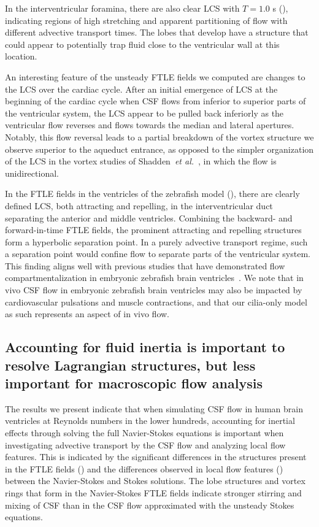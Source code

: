 \documentclass{template}
\begin{document}
In the interventricular foramina, there are also
clear LCS with $T=1.0$ s (),
indicating regions of high stretching and apparent partitioning of flow
with different advective transport times. The lobes that develop
have a structure that could appear to potentially trap fluid
close to the ventricular wall at this location.

An interesting feature of the unsteady FTLE fields we computed
are changes to the LCS over the cardiac cycle. After an initial emergence of LCS
at the beginning of the cardiac cycle when CSF flows from inferior to superior
parts of the ventricular system, the LCS appear to be pulled back inferiorly as the ventricular flow
reverses and flows towards the median and lateral apertures. Notably, this flow reversal
leads to a partial breakdown of the vortex structure we observe superior to the aqueduct entrance,
as opposed to the simpler organization of the LCS in the vortex studies of
Shadden~\emph{et al.}~\citep{shadden2006lagrangian,shadden2007transport},
in which the flow is unidirectional.

In the FTLE fields in the ventricles of the zebrafish model (),
there are clearly defined LCS, both attracting and repelling,
in the interventricular duct separating the anterior and middle ventricles.
Combining the backward- and forward-in-time FTLE fields,
the prominent attracting and repelling structures form a hyperbolic separation point. 
In a purely advective transport regime, such a separation point would confine
flow to separate parts of the ventricular system.
This finding aligns well with previous studies that have demonstrated flow
compartmentalization in embryonic zebrafish
brain ventricles~\citep{Olstad2019CiliaryDevelopment,
Herlyng2025AdvectionDiffusion}. We note that
in vivo CSF flow in embryonic zebrafish brain ventricles may also be impacted
by cardiovascular pulsations and muscle contractions, and that our cilia-only model
as such represents an aspect of in vivo flow.

\subsection{Accounting for fluid inertia is important to resolve Lagrangian structures,
but less important for macroscopic flow analysis}
The results we present indicate that when simulating CSF flow
in human brain ventricles at Reynolds numbers in the lower hundreds,
accounting for inertial effects through
solving the full Navier-Stokes equations is important when investigating
advective transport by the CSF flow and analyzing local flow features.
This is indicated by the significant differences in the structures
present in the FTLE fields () and the
differences observed in local flow features ()
between the Navier-Stokes and Stokes solutions. The lobe structures and
vortex rings that form in the Navier-Stokes FTLE fields
indicate stronger stirring and mixing of
CSF than in the CSF flow approximated with the unsteady Stokes equations.
\end{document}
